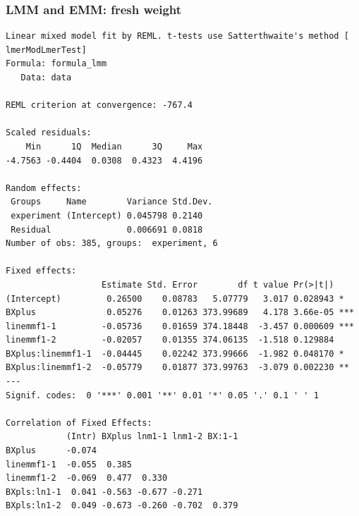 \documentclass[
  10pt,
]{article}
\begin{document}
\subsubsection{\texorpdfstring{\textbf{LMM and EMM: fresh
weight}}{LMM and EMM: fresh weight}}\label{lmm-and-emm-fresh-weight-1}

\begin{verbatim}
Linear mixed model fit by REML. t-tests use Satterthwaite's method [
lmerModLmerTest]
Formula: formula_lmm
   Data: data

REML criterion at convergence: -767.4

Scaled residuals: 
    Min      1Q  Median      3Q     Max 
-4.7563 -0.4404  0.0308  0.4323  4.4196 

Random effects:
 Groups     Name        Variance Std.Dev.
 experiment (Intercept) 0.045798 0.2140  
 Residual               0.006691 0.0818  
Number of obs: 385, groups:  experiment, 6

Fixed effects:
                   Estimate Std. Error        df t value Pr(>|t|)    
(Intercept)         0.26500    0.08783   5.07779   3.017 0.028943 *  
BXplus              0.05276    0.01263 373.99689   4.178 3.66e-05 ***
linemmf1-1         -0.05736    0.01659 374.18448  -3.457 0.000609 ***
linemmf1-2         -0.02057    0.01355 374.06135  -1.518 0.129884    
BXplus:linemmf1-1  -0.04445    0.02242 373.99666  -1.982 0.048170 *  
BXplus:linemmf1-2  -0.05779    0.01877 373.99763  -3.079 0.002230 ** 
---
Signif. codes:  0 '***' 0.001 '**' 0.01 '*' 0.05 '.' 0.1 ' ' 1

Correlation of Fixed Effects:
            (Intr) BXplus lnm1-1 lnm1-2 BX:1-1
BXplus      -0.074                            
linemmf1-1  -0.055  0.385                     
linemmf1-2  -0.069  0.477  0.330              
BXpls:ln1-1  0.041 -0.563 -0.677 -0.271       
BXpls:ln1-2  0.049 -0.673 -0.260 -0.702  0.379
\end{verbatim}
\end{document}
